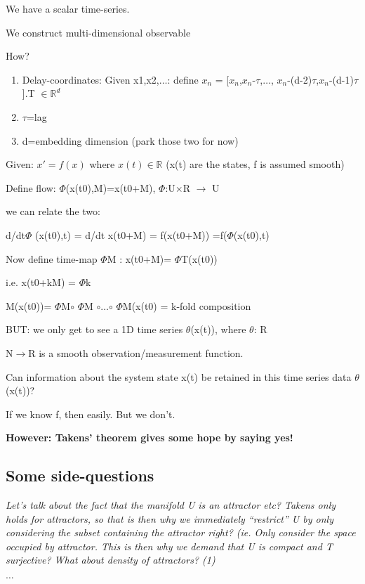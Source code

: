 \documentclass[12pt, oneside]{article}
\theoremstyle{definition}
\begin{document}
We have a scalar time-series.

We construct multi-dimensional observable 

How? 
\begin{enumerate}
  \item Delay-coordinates: Given {x1,x2,$\ldots$}: define $x_{n}$ = [$x_{n}$,$x_{n}$-$\tau$,$\ldots$, $x_{n}$-(d-2)$\tau$,$x_{n}$-(d-1)$\tau$].T $\in\mathbb{R}^{d}$ 
  \item $\tau$=lag
  \item d=embedding dimension (park those two for now)
\end{enumerate}


Given: $x' = f(x)$ where $x(t)\in\mathbb{R}$  (x(t) are the states, f is assumed smooth)

Define flow: $\Phi$(x(t0),M)=x(t0+M), $\Phi$:U$\times$R $\rightarrow$ U 

we can relate the two:  

d/dt$\Phi$ (x(t0),t) = d/dt x(t0+M) = f(x(t0+M)) =f($\Phi$(x(t0),t)

Now define time-map $\Phi$M : x(t0+M)= $\Phi$T(x(t0)) 

i.e. x(t0+kM) = $\Phi$k 

M(x(t0))= $\Phi$M$\circ$ $\Phi$M $\circ$$\ldots$$\circ$ $\Phi$M(x(t0) = k-fold composition 

BUT: we only get to see a 1D time series $\theta$(x(t)), where $\theta$: R 

N$\rightarrow$R is a smooth observation/measurement function. 

Can information about the system state x(t) be retained in this time series data $\theta$(x(t))? 

If we know f, then easily. But we don’t.


\textbf{However: Takens’ theorem gives some hope by saying yes! }


\subsection{Some side-questions}
\emph{Let’s talk about the fact that the manifold U is an attractor etc? Takens only holds for attractors, so
that is then why we immediately “restrict” U by only considering the subset containing the attractor
right? (ie. Only consider the space occupied by attractor. This is then why we demand that U is
compact and T surjective?
What about density of attractors? (1)}

$\ldots$
\end{document}
